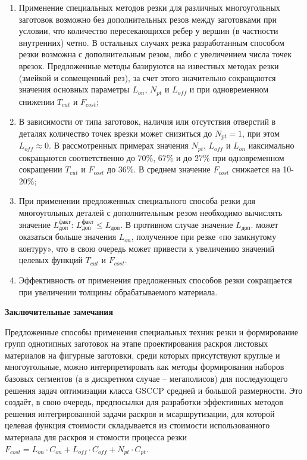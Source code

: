 \documentclass[12pt]{report}
\begin{document}
\begin{enumerate}
\item Применение специальных методов резки
для различных многоугольных заготовок возможно
без дополнительных резов между заготовками при условии,
что количество пересекающихся ребер у вершин
(в частности внутренних) четно.
В остальных случаях резка разработанным
способом резки возможна с дополнительным резом,
либо с увеличением числа точек врезок.
Предложенные методы базируются на известных методах резки
(змейкой и совмещенный рез),
за счет этого значительно сокращаются
значения основных параметры
$L_{on}$, $N_{pt}$  и $L_{off}$
и   при одновременном снижении
$T_{cut}$
и
$F_{cost}$;

\item В зависимости от типа заготовок,
наличия или отсутствия отверстий в деталях
количество точек врезки может снизиться до
$N_{pt}=1$,
при этом
$L_{off} \approx 0$.
В рассмотренных примерах значения
$N_{pt}$, $L_{off}$ и $L_{on}$
иаксимально сокращаются соответственно до 70\%, 67\% и до 27\%
при одновременном сокращении
$T_{cut}$
и
$F_{cost}$
до 36\%.
В среднем значение $F_{cost}$ снижается на 10-20\%;

\item При применении предложенных специального способа резки
для многоугольных деталей с дополнительным резом
необходимо вычислять значение
$L_\text{доп}^\text{факт}$:
$L_\text{доп}^\text{факт} \leqslant L_\text{доп}$.
В противном случае значение
$L_\text{доп}$.
может оказаться больше значения
$L_{on}$,
полученное при резке «по замкнутому контуру»,
что в свою очередь может привести к увеличению значений целевых функций
$T_{cut}$
и
$F_{cost}$.

\item Эффективность от применения предложенных способов резки
сокращается при увеличении толщины обрабатываемого материала.
\end{enumerate}

{\bf Заключительные замечания}

Предложенные способы применения специальных техник резки и
формирование групп однотипных заготовок на этапе
проектирования раскроя листовых материалов на фигурные заготовки,
среди которых присутствуют круглые и многоугольные,
можно интерпретировать как методы формирования наборов базовых сегментов
(а в дискретном случае – мегаполисов)
для последующего решения задач оптимизации класса GSCCP
средней и большой размерности.
Это создаёт, в свою очередь,
предпосылки  для разработки эффективных методов
решения интегрированной задачи раскроя и мсаршрутизации,
для которой целевая функция стоимости складывается
из стоимости использованного материала для раскроя
и стомости процесса резки
$
F_{cost}=
L_{on} \cdot C_{on} +
L_{off} \cdot C_{off} +
N_{pt} \cdot C_{pt}
$.
\end{document}
